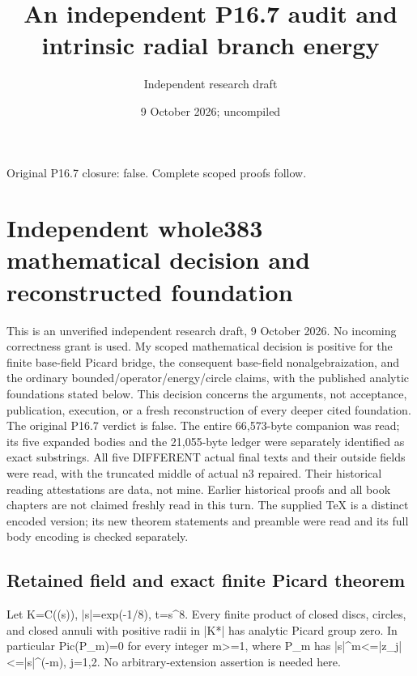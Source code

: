 \documentclass[11pt]{article}
\title{An independent P16.7 audit and intrinsic radial branch energy}
\author{Independent research draft}
\date{9 October 2026; uncompiled}
\begin{document}
\maketitle
Original P16.7 closure: false. Complete scoped proofs follow.
\section*{Independent whole383 mathematical decision and reconstructed foundation}

This is an unverified independent research draft, 9 October 2026. No incoming correctness grant is used. My scoped mathematical decision is positive for the finite base-field Picard bridge, the consequent base-field nonalgebraization, and the ordinary bounded/operator/energy/circle claims, with the published analytic foundations stated below. This decision concerns the arguments, not acceptance, publication, execution, or a fresh reconstruction of every deeper cited foundation. The original P16.7 verdict is false. The entire 66,573-byte companion was read; its five expanded bodies and the 21,055-byte ledger were separately identified as exact substrings. All five DIFFERENT actual final texts and their outside fields were read, with the truncated middle of actual n3 repaired. Their historical reading attestations are data, not mine. Earlier historical proofs and all book chapters are not claimed freshly read in this turn. The supplied TeX is a distinct encoded version; its new theorem statements and preamble were read and its full body encoding is checked separately.

\subsection*{Retained field and exact finite Picard theorem}

Let K=C((s)), |s|=exp(-1/8), t=s\textasciicircum{}8. Every finite product of closed discs, circles, and closed annuli with positive radii in |K*| has analytic Picard group zero. In particular Pic(P\_m)=0 for every integer m>=1, where P\_m has |s|\textasciicircum{}m<=|z\_j|<=|s|\textasciicircum{}(-m), j=1,2. No arbitrary-extension assertion is needed here.
\end{document}
